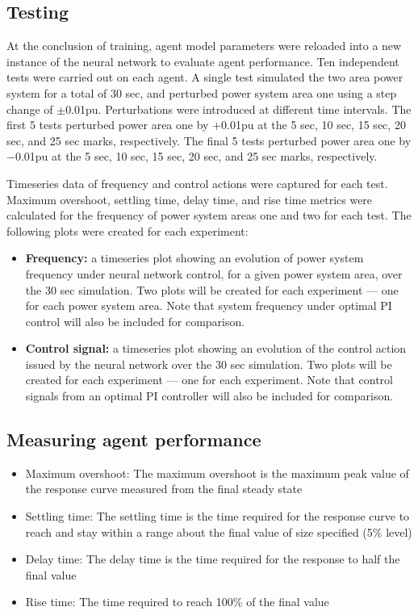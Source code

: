 \subsection{Testing}\label{ssec:testing}
At the conclusion of training, agent model parameters were reloaded into a new instance of the neural network to evaluate agent performance. Ten independent tests were carried out on each agent. A single test simulated the two area power system for a total of 30 sec, and perturbed power system area one using a step change of $\pm$0.01pu. Perturbations were introduced at different time intervals. The first 5 tests perturbed power area one by $+$0.01pu at the 5 sec, 10 sec, 15 sec, 20 sec, and 25 sec marks, respectively. The final 5 tests perturbed power area one by $-$0.01pu at the 5 sec, 10 sec, 15 sec, 20 sec, and 25 sec marks, respectively.

Timeseries data of frequency and control actions were captured for each test. Maximum overshoot, settling time, delay time, and rise time metrics were calculated for the frequency of power system areas one and two for each test. The following plots were created for each experiment:
\begin{itemize}
	\item \textbf{Frequency:} a timeseries plot showing an evolution of power system frequency under neural network control, for a given power system area, over the 30 sec simulation. Two plots will be created for each experiment --- one for each power system area. Note that system frequency under optimal PI control will also be included for comparison.
	\item \textbf{Control signal:} a timeseries plot showing an evolution of the control action issued by the neural network over the 30 sec simulation. Two plots will be created for each experiment --- one for each experiment. Note that control signals from an optimal PI controller will also be included for comparison.
\end{itemize}


\subsection{Measuring agent performance}\label{sec:agent_performance}
\begin{itemize}
	\item Maximum overshoot: The maximum overshoot is the maximum peak value of the response curve measured from the final steady state
	\item Settling time: The settling time is the time required for the response curve to reach and stay within a range about the final value of size specified (5\% level)
	\item Delay time: The delay time is the time required for the response to half the final value
	\item Rise time: The time required to reach 100\% of the final value
\end{itemize}

